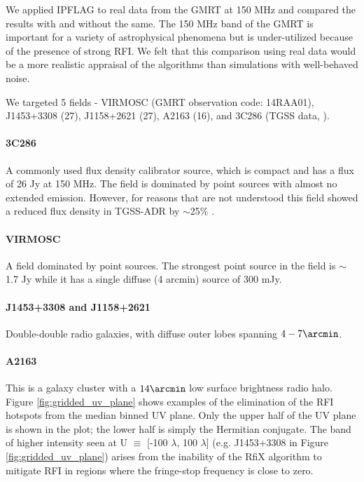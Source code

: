 \documentclass[twocolumn]{aastex61}
\begin{document}
{We applied IPFLAG to real data from the GMRT at 150 MHz and compared the results
with and without the same. The 150 MHz band of the GMRT is important for
a variety of astrophysical phenomena but is under-utilized because of the
presence of strong RFI.  We felt that this comparison using real data would be
a more realistic appraisal of the algorithms than simulations with well-behaved
noise.

We targeted 5 fields - VIRMOSC (GMRT observation code: 14RAA01),
J1453+3308 (27), J1158+2621 (27), A2163
(16), and 3C286 (TGSS data, \citealt{intema2017gmrt}).

\paragraph{3C286} A commonly used flux density calibrator source, which is
compact and has a flux of 26 Jy at 150 MHz. The field is dominated by point
sources with almost no extended emission. However, for reasons that are not
understood this field showed a reduced flux density in TGSS-ADR by $\sim$25\%
\citep[see][]{intema2017gmrt}.

\paragraph{VIRMOSC} A field dominated by point sources. The strongest point
source in the field is $\sim$ 1.7 Jy while it has a single diffuse (4 arcmin)
source of 300 mJy.

\paragraph{J1453+3308 and J1158+2621} Double-double radio galaxies, with
diffuse outer lobes spanning $4-7 \arcmin$.

\paragraph{A2163} This is a galaxy cluster with a $14\arcmin$ low surface
brightness radio halo.\\

Figure \ref{fig:gridded_uv_plane} shows examples of the elimination of the RFI
hotspots from the median binned UV plane. Only the upper half of the
UV plane is shown in the plot; the lower half is simply the Hermitian
conjugate. The band of higher intensity seen at U $\equiv$ [-100 $\lambda$, 100
$\lambda$] (e.g.  J1453+3308 in Figure \ref{fig:gridded_uv_plane}) arises from
the inability of the RfiX algorithm to mitigate RFI in regions where the
fringe-stop frequency is close to zero.

}
\end{document}

